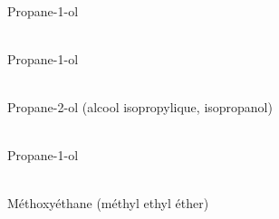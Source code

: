\documentclass{article}
\begin{document}
\vfill
\begin{center}
\\
Propane-1-ol
\end{center}
\vfill

\vfill
\begin{center}
\\
Propane-1-ol
\end{center}
\vfill

\begin{center}
\\
Propane-2-ol (alcool isopropylique, isopropanol)
\end{center}
\vfill

\begin{center}
\\
Propane-1-ol
\end{center}
\vfill

\begin{center}
\\
Méthoxyéthane (méthyl ethyl éther)
\end{center}
\vfill
\end{document}
